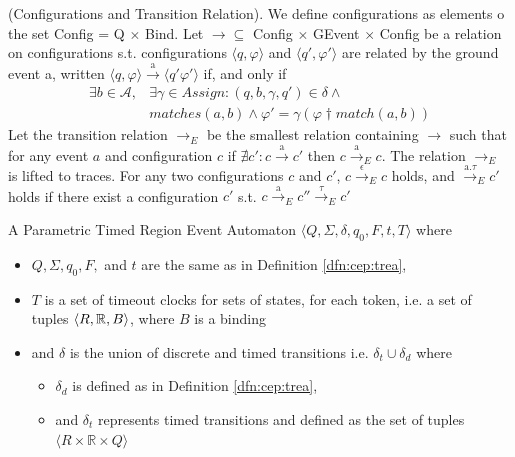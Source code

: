 				\begin{dfn}
					(Configurations and Transition Relation).
					We define configurations as elements o the set Config = Q $\times$ Bind. Let $\rightarrow \subseteq$ Config $\times$ GEvent $\times$ Config be a relation on
					configurations s.t. configurations $\langle q, \varphi \rangle$ and $\langle q', \varphi' \rangle$ are related by the ground event a, written
					$\langle q, \varphi \rangle \xrightarrow{\text{a}} \langle q' \varphi' \rangle$ if, and only if
						\begin{align}
							\exists b \in \mathcal{A}, & \exists \gamma \in Assign : (q, b, \gamma, q') \in \delta \wedge \\
							&matches(a,b) \wedge \varphi' = \gamma(\varphi \dagger match(a,b))
						\end{align}
					Let the transition relation $\rightarrow_{E}$ be the smallest relation containing $\rightarrow$ such that for any event
					$a$ and configuration $c$ if $\nexists c' : c \xrightarrow{\text{a}} c'$ then $ c \xrightarrow{\text{a}}_E c$.
					The relation $\rightarrow_E$ is lifted to traces.
					For any two configurations $c$ and $c'$, $ c \xrightarrow{\text{$\epsilon$}}_E c$ holds, and $\xrightarrow{\text{a.$\tau$}}_E c'$ holds
					if there exist a configuration $c'$ s.t. $c \xrightarrow{\text{a}}_E c'' \xrightarrow{\text{$\tau$}}_E c'$
				\end{dfn}
				
				
				\begin{dfn}
					\label{dfn:cep:ptrea}
					A Parametric Timed Region Event Automaton $\langle Q,\Sigma,\delta,q_0, F, t, T \rangle$ where
					\begin{itemize}
						\item $Q, \Sigma, q_0, F,$ and  $t$ are the same as in Definition \ref{dfn:cep:trea},
						\item $T$ is a set of timeout clocks for sets of states, for each token, i.e. a set of tuples $\langle R, \mathbb{R}, B \rangle$, where $B$ is a binding
						\item and $\delta$ is the union of discrete and timed transitions i.e. $\delta_t \cup \delta_d$ where
						\begin{itemize}
							\item $\delta_d$ is defined as in Definition \ref{dfn:cep:trea},
							\item and $\delta_t$ represents timed transitions and defined as the set of tuples $\langle R \times \mathbb{R} \times Q \rangle$ 
						\end{itemize}
					\end{itemize}
				\end{dfn}
				
